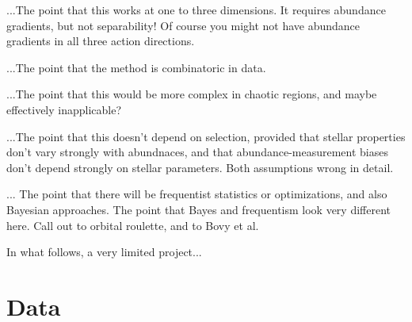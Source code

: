 \documentclass[modern]{aastex63}
\newcommand{\galah}{\acronym{GALAH}}
\newcommand{\hermes}{\acronym{HERMES}}
\begin{document}
...The point that this works at one to three dimensions. It requires abundance gradients, but not separability!
Of course you might not have abundance gradients in all three action directions.

...The point that the method is combinatoric in data.

...The point that this would be more complex in chaotic regions, and maybe effectively
inapplicable?

...The point that this doesn't depend on selection, provided that stellar properties don't vary strongly with abundnaces, and that abundance-measurement biases don't depend strongly on stellar parameters. Both assumptions wrong in detail.

... The point that there will be frequentist statistics or optimizations, and also Bayesian approaches.
The point that Bayes and frequentism look very different here. Call out to orbital
roulette, and to Bovy et al.

In what follows, a very limited project...

\section{Data}



\end{document}
